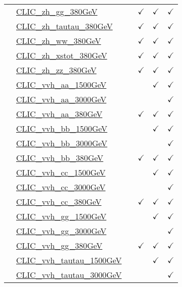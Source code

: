 \documentclass{article}
\begin{document}
\begin{longtable}{|c|l|c|c|c|c|}
 & \href{https://arxiv.org}{CLIC_zh_gg_380GeV}  &  & $\checkmark$ & $\checkmark$ & $\checkmark$\\ \cline{2-6}
 & \href{https://arxiv.org}{CLIC_zh_tautau_380GeV}  &  & $\checkmark$ & $\checkmark$ & $\checkmark$\\ \cline{2-6}
 & \href{https://arxiv.org}{CLIC_zh_ww_380GeV}  &  & $\checkmark$ & $\checkmark$ & $\checkmark$\\ \cline{2-6}
 & \href{https://arxiv.org}{CLIC_zh_xstot_380GeV}  &  & $\checkmark$ & $\checkmark$ & $\checkmark$\\ \cline{2-6}
 & \href{https://arxiv.org}{CLIC_zh_zz_380GeV}  &  & $\checkmark$ & $\checkmark$ & $\checkmark$\\ \cline{2-6}
 & \href{https://arxiv.org}{CLIC_vvh_aa_1500GeV}  &  &  & $\checkmark$ & $\checkmark$\\ \cline{2-6}
 & \href{https://arxiv.org}{CLIC_vvh_aa_3000GeV}  &  &  &  & $\checkmark$\\ \cline{2-6}
 & \href{https://arxiv.org}{CLIC_vvh_aa_380GeV}  &  & $\checkmark$ & $\checkmark$ & $\checkmark$\\ \cline{2-6}
 & \href{https://arxiv.org}{CLIC_vvh_bb_1500GeV}  &  &  & $\checkmark$ & $\checkmark$\\ \cline{2-6}
 & \href{https://arxiv.org}{CLIC_vvh_bb_3000GeV}  &  &  &  & $\checkmark$\\ \cline{2-6}
 & \href{https://arxiv.org}{CLIC_vvh_bb_380GeV}  &  & $\checkmark$ & $\checkmark$ & $\checkmark$\\ \cline{2-6}
 & \href{https://arxiv.org}{CLIC_vvh_cc_1500GeV}  &  &  & $\checkmark$ & $\checkmark$\\ \cline{2-6}
 & \href{https://arxiv.org}{CLIC_vvh_cc_3000GeV}  &  &  &  & $\checkmark$\\ \cline{2-6}
 & \href{https://arxiv.org}{CLIC_vvh_cc_380GeV}  &  & $\checkmark$ & $\checkmark$ & $\checkmark$\\ \cline{2-6}
 & \href{https://arxiv.org}{CLIC_vvh_gg_1500GeV}  &  &  & $\checkmark$ & $\checkmark$\\ \cline{2-6}
 & \href{https://arxiv.org}{CLIC_vvh_gg_3000GeV}  &  &  &  & $\checkmark$\\ \cline{2-6}
 & \href{https://arxiv.org}{CLIC_vvh_gg_380GeV}  &  & $\checkmark$ & $\checkmark$ & $\checkmark$\\ \cline{2-6}
 & \href{https://arxiv.org}{CLIC_vvh_tautau_1500GeV}  &  &  & $\checkmark$ & $\checkmark$\\ \cline{2-6}
 & \href{https://arxiv.org}{CLIC_vvh_tautau_3000GeV}  &  &  &  & $\checkmark$\\ \cline{2-6}

\end{longtable}
\end{document}
